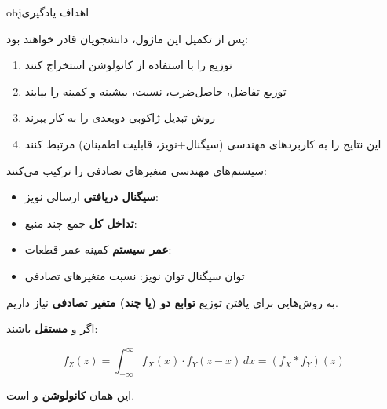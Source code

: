 \begin{PSbox}[unbreakable]{obj}{اهداف یادگیری}

پس از تکمیل این ماژول، دانشجویان قادر خواهند بود:

\begin{enumerate}
\def\labelenumi{\arabic{enumi}.}
\tightlist
\item
  توزیع  را با استفاده از کانولوشن استخراج کنند
\item
  توزیع تفاضل، حاصل‌ضرب، نسبت، بیشینه و کمینه را بیابند
\item
  روش تبدیل ژاکوبی دوبعدی را به کار ببرند
\item
  این نتایج را به کاربردهای مهندسی (سیگنال+نویز، قابلیت اطمینان) مرتبط کنند
\end{enumerate}

\end{PSbox}


سیستم‌های مهندسی متغیرهای تصادفی را ترکیب می‌کنند:

\begin{itemize}
\tightlist
\item
  \textbf{سیگنال دریافتی} \lr{=} ارسالی \lr{+} نویز: 
\item
  \textbf{تداخل کل} \lr{=} جمع چند منبع: 
\item
  \textbf{عمر سیستم} \lr{=} کمینه عمر قطعات: 
\item
   توان سیگنال \lr{/} توان نویز: نسبت متغیرهای تصادفی
\end{itemize}

به روش‌هایی برای یافتن توزیع \textbf{توابع دو (یا چند) متغیر تصادفی} نیاز داریم.





اگر  و  \textbf{مستقل} باشند:

\[f_Z(z) = \int_{-\infty}^{\infty} f_X(x) \cdot f_Y(z-x) \, dx = (f_X * f_Y)(z)\]

این همان \textbf{کانولوشن}  و  است.

